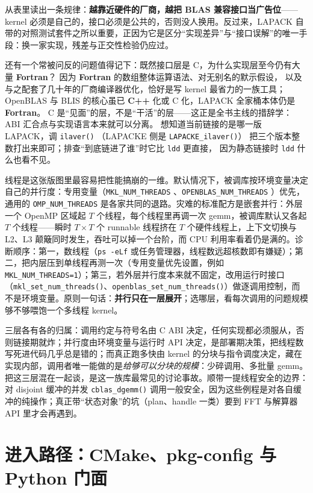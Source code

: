\documentclass[12pt,a4paper,fontset=fandol]{ctexbook}
\newcommand{\Fn}[1]{\texttt{#1()}}
\newcommand{\Tp}[1]{\texttt{#1}}
\newcommand{\Bk}{\allowbreak}
\newcommand{\Lang}[1]{\textsf{\bfseries #1}}
\newcommand{\CPP}{\Lang{C++}}
\newcommand{\FTN}{\Lang{Fortran}}
\newcommand{\PY}{\Lang{Python}}
\begin{document}
从表里读出一条规律：\textbf{越靠近硬件的厂商，越把 BLAS 兼容接口当广告位}——kernel 必须是自己的，接口必须是公共的，否则没人换用。反过来，LAPACK 自带的对照测试套件之所以重要，正因为它是区分``实现差异''与``接口误解''的唯一手段：换一家实现，残差与正交性检验仍应过。

还有一个常被问反的问题值得记下：既然接口层是 C，为什么实现层至今仍有大量 \FTN{}？
因为 \FTN{} 的数组整体运算语法、对无别名的默示假设，
以及与之配套了几十年的厂商编译器优化，恰好是写 kernel 最省力的一族工具；
OpenBLAS 与 BLIS 的核心虽已 \CPP{} 化或 C 化，LAPACK 全家桶本体仍是 \FTN{}。
C 是``见面''的层，不是``干活''的层——这正是全书主线的措辞学：
ABI 汇合点与实现语言本来就可以分离。
想知道当前链接的是哪一版 LAPACK，调 \Fn{ilaver} \Bk{}（LAPACKE 侧是 \Fn{LAPACKE\_ilaver}）
把三个版本整数打出来即可；排查``到底链进了谁''时它比 \Tp{ldd} \Bk{} 更直接，
因为静态链接时 \Tp{ldd} 什么也看不见。

线程是这张版图里最容易把性能搞崩的一维。默认情况下，被调库按环境变量决定自己的并行度：专用变量（\Tp{MKL\_NUM\_THREADS} \Bk{}、\Tp{OPENBLAS\_NUM\_THREADS} \Bk{}）优先，通用的 \Tp{OMP\_NUM\_THREADS} \Bk{} 是各家共同的退路。灾难的标准配方是嵌套并行：外层一个 OpenMP 区域起 $T$ 个线程，每个线程里再调一次 gemm，被调库默认又各起 $T$ 个线程——瞬时 $T \times T$ 个 runnable 线程挤在 $T$ 个硬件线程上，上下文切换与 L2、L3 颠簸同时发生，吞吐可以掉一个台阶，而 CPU 利用率看着仍是满的。诊断顺序：第一，数线程（\Tp{ps -eLf} \Bk{} 或任务管理器，线程数远超核数即有嫌疑）；第二，把内层压到单线程再测一次（专用变量优先设置，例如 \Tp{MKL\_NUM\_THREADS=1}）；第三，若外层并行度本来就不固定，改用运行时接口（\Fn{mkl\_set\_num\_threads}、\Fn{openblas\_set\_num\_threads}）做逐调用控制，而不是环境变量。原则一句话：\textbf{并行只在一层展开}；选哪层，看每次调用的问题规模够不够喂饱一个多线程 kernel。

\begin{note}[title={接口、线程与 kernel 三层各有归属}]
三层各有各的归属：调用约定与符号名由 C ABI 决定，任何实现都必须服从，否则链接期就炸；并行度由环境变量与运行时 API 决定，是部署期决策，把线程数写死进代码几乎总是错的；而真正跑多快由 kernel 的分块与指令调度决定，藏在实现内部，调用者唯一能做的是\emph{给够可以分块的规模}：少碎调用、多批量 gemm。把这三层混在一起谈，是这一族库最常见的讨论事故。顺带一提线程安全的边界：对 disjoint 缓冲的并发 \Fn{cblas\_dgemm} \Bk{} 调用一般安全，因为这些例程是对各自缓冲的纯操作；真正带``状态对象''的坑（plan、handle 一类）要到 FFT 与解算器 API 里才会再遇到。
\end{note}

\section{进入路径：CMake、pkg-config 与 \PY{} 门面}
\end{document}
